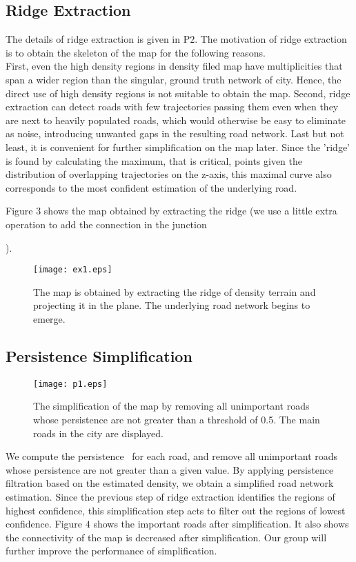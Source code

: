 \documentclass[11pt]{article}
\begin{document}
\subsection*{Ridge Extraction}
The details of ridge extraction is given in P$2$. The motivation of ridge extraction is to obtain the skeleton of the map for the following reasons.\\
First, even the high density regions in density filed map have multiplicities that span a wider region than the singular, ground truth network of city. Hence, the direct use of high density regions is not suitable to obtain the map. Second, ridge extraction
can detect roads with few trajectories passing them even when they
are next to heavily populated roads, which would otherwise be easy to eliminate as noise, introducing unwanted gaps in the resulting road network. Last but not least, it is convenient for further simplification on the map later. Since the 'ridge' is found by calculating the maximum, that is critical, points given the distribution of overlapping trajectories on the z-axis, this maximal curve also corresponds to the most confident estimation of the underlying road. 

Figure $3$ shows the map obtained by extracting the ridge (we use a little extra operation to add the connection in the junction \begin{comment} WHY? \end{comment}).
 \begin{figure}[H]
  \caption{The map is obtained by extracting the ridge of density terrain and projecting it in the plane. The underlying road network begins to emerge.}
  \centering 
 \texttt{[image: ex1.eps]} 
\end{figure}

\subsection*{Persistence Simplification}
\begin{figure}[h!]
  \caption{The simplification of the map by removing all unimportant roads whose persistence are not greater than a threshold of 0.5. The main roads in the city are displayed.} 
  \centering
 \texttt{[image: p1.eps]} 
\end{figure}
We compute the persistence~\cite{edelsbrunner2008persistent} for each road, and remove all unimportant roads whose persistence are not greater than a given value. By applying persistence filtration based on the estimated density, we obtain a simplified road network estimation. Since the previous step of ridge extraction identifies the regions of highest confidence, this simplification step acts to filter out the regions of lowest confidence. Figure $4$ shows the important roads after simplification. It also shows the connectivity of the map is decreased after simplification. Our group will further improve the performance of simplification.
\end{document}
